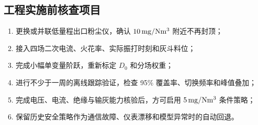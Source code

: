 \subsection{工程实施前核查项目}

\begin{enumerate}
  \item 更换或并联低量程出口粉尘仪，确认 $10\,\mathrm{mg/Nm^3}$ 附近不再封顶；
  \item 接入四场二次电流、火花率、实际振打时刻和灰斗料位；
  \item 完成小幅单变量阶跃，重新标定 $D_0$ 和分场权重；
  \item 进行不少于一周的离线跟踪验证，检查 95\% 覆盖率、切换频率和峰值叠加；
  \item 完成电压、电流、绝缘与输灰能力核验后，方可启用 $5\,\mathrm{mg/Nm^3}$ 条件策略；
  \item 保留历史安全策略作为通信故障、仪表漂移和模型异常时的自动回退。
\end{enumerate}

